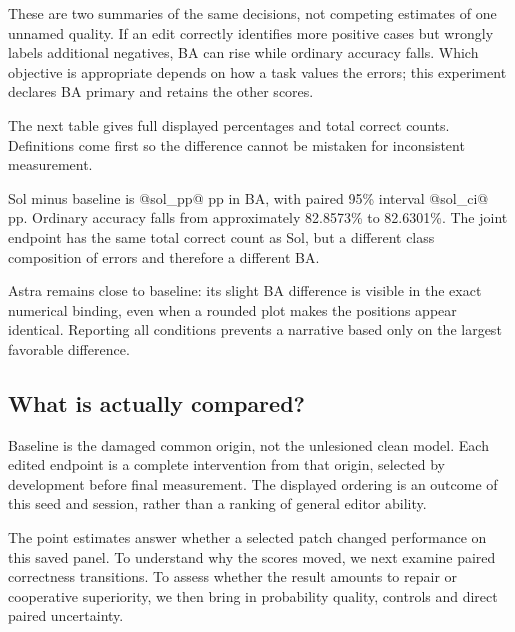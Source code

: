 
These are two summaries of the same decisions, not competing estimates of one unnamed quality. If an edit correctly identifies more positive cases but wrongly labels additional negatives, BA can rise while ordinary accuracy falls. Which objective is appropriate depends on how a task values the errors; this experiment declares BA primary and retains the other scores.

The next table gives full displayed percentages and total correct counts. Definitions come first so the difference cannot be mistaken for inconsistent measurement.


Sol minus baseline is @sol_pp@ pp in BA, with paired 95\% interval @sol_ci@ pp. Ordinary accuracy falls from approximately 82.8573\% to 82.6301\%. The joint endpoint has the same total correct count as Sol, but a different class composition of errors and therefore a different BA.

Astra remains close to baseline: its slight BA difference is visible in the exact numerical binding, even when a rounded plot makes the positions appear identical. Reporting all conditions prevents a narrative based only on the largest favorable difference.

\subsection*{What is actually compared?}
Baseline is the damaged common origin, not the unlesioned clean model. Each edited endpoint is a complete intervention from that origin, selected by development before final measurement. The displayed ordering is an outcome of this seed and session, rather than a ranking of general editor ability.

The point estimates answer whether a selected patch changed performance on this saved panel. To understand why the scores moved, we next examine paired correctness transitions. To assess whether the result amounts to repair or cooperative superiority, we then bring in probability quality, controls and direct paired uncertainty.

